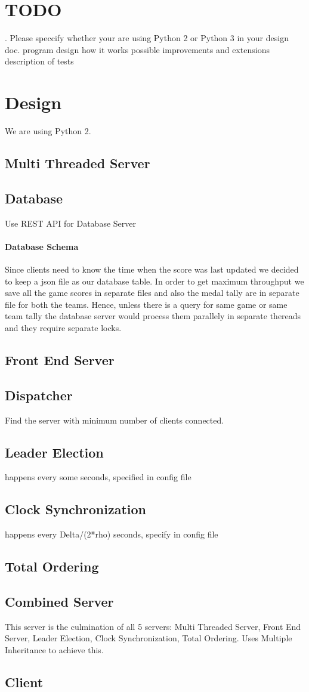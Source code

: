 \documentclass{article}
\begin{document}
\section{TODO}
. Please speccify whether your are using Python 2 or Python 3 in your design doc.
program design 
how it works
possible improvements and extensions
description of tests

\section{Design}
We are using Python 2.

\subsection{Multi Threaded Server}

\subsection{Database}

Use REST API for Database Server
\paragraph{Database Schema}
Since clients need to know the time when the score was last updated we 
decided to keep a json file as our database table. In order to get 
maximum throughput we save all the game scores in separate files and 
also the medal tally are in separate file for both the teams. Hence, 
unless there is a query for same game or same team tally the database
server would process them parallely in separate thereads and they 
require separate locks.

\subsection{Front End Server}

\subsection{Dispatcher}
Find the server with minimum number of clients connected.

\subsection{Leader Election}
happens every some seconds, specified in config file
\subsection{Clock Synchronization}
happens every Delta/(2*rho) seconds, specify in config file
\subsection{Total Ordering}

\subsection{Combined Server}
This server is the culmination of all 5 servers: Multi Threaded Server, 
Front End Server, Leader Election, Clock Synchronization, Total Ordering.
Uses Multiple Inheritance to achieve this.

\subsection{Client}
\end{document}
